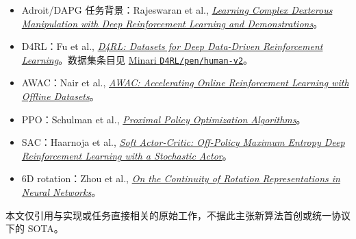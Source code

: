 \begin{itemize}
\tightlist
\item
  Adroit/DAPG 任务背景：Rajeswaran et al., \href{https://arxiv.org/abs/1709.10087}{\emph{Learning Complex Dexterous Manipulation with Deep Reinforcement Learning and Demonstrations}}。
\item
  D4RL：Fu et al., \href{https://arxiv.org/abs/2004.07219}{\emph{D4RL: Datasets for Deep Data-Driven Reinforcement Learning}}。数据集条目见 \href{https://minari.farama.org/main/datasets/D4RL/pen/human-v2/}{Minari \texttt{D4RL/pen/human-v2}}。
\item
  AWAC：Nair et al., \href{https://arxiv.org/abs/2006.09359}{\emph{AWAC: Accelerating Online Reinforcement Learning with Offline Datasets}}。
\item
  PPO：Schulman et al., \href{https://arxiv.org/abs/1707.06347}{\emph{Proximal Policy Optimization Algorithms}}。
\item
  SAC：Haarnoja et al., \href{https://proceedings.mlr.press/v80/haarnoja18b.html}{\emph{Soft Actor-Critic: Off-Policy Maximum Entropy Deep Reinforcement Learning with a Stochastic Actor}}。
\item
  6D rotation：Zhou et al., \href{https://openaccess.thecvf.com/content_CVPR_2019/html/Zhou_On_the_Continuity_of_Rotation_Representations_in_Neural_Networks_CVPR_2019_paper.html}{\emph{On the Continuity of Rotation Representations in Neural Networks}}。
\end{itemize}

本文仅引用与实现或任务直接相关的原始工作，不据此主张新算法首创或统一协议下的 SOTA。

\nocite{*}

